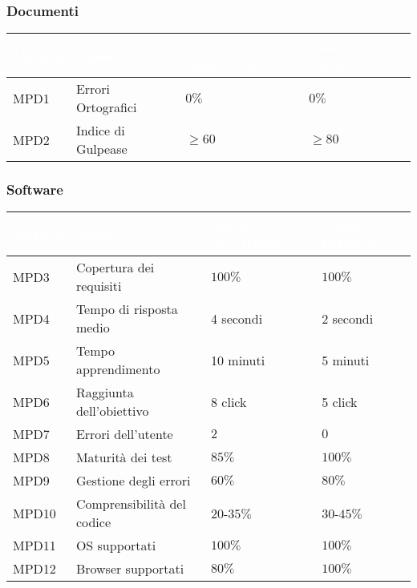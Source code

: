 \subsubsection{Documenti}
\begin{center}
  \renewcommand{\arraystretch}{1.25}
  \begin{longtable}{|p{1.8cm}|p{3.5cm}|p{3.8cm}|p{3.3cm}|} \hline
    \rowcolor[HTML]{036400}
    \textcolor{white}{\textbf{Metrica}} & \textcolor{white}{\textbf{Nome}} & \textcolor{white}{\textbf{Valore Accettabile}} & \textcolor{white}{\textbf{Valore Ottimale}}    \\ \hline
      \rowcolor[HTML]{EFEFEF}
      MPD1 & Errori Ortografici    & $0\%$      & $0\%$        \\ \hline
      \rowcolor[HTML]{C0C0C0}
      MPD2 & Indice di Gulpease    & $\geq60$   & $\geq80$     \\ \hline
  \end{longtable}
\end{center}

\subsubsection{Software}
\begin{center}
  \renewcommand{\arraystretch}{1.25}
  \begin{longtable}{|p{1.8cm}|p{4.5cm}|p{3.8cm}|p{3.5cm}|} \hline
    \rowcolor[HTML]{036400}
    \textcolor{white}{\textbf{Metrica}} & \textcolor{white}{\textbf{Nome}} & \textcolor{white}{\textbf{Valore Accettabile}} & \textcolor{white}{\textbf{Valore Ottimale}}   \\ \hline
      MPD3 & Copertura dei requisiti & $100\%$ & $100\%$  \\ \hline
      \rowcolor[HTML]{EFEFEF}
      MPD4 & Tempo di risposta medio    &  4 secondi  &  2 secondi   \\ \hline
      \rowcolor[HTML]{C0C0C0}
      MPD5 & Tempo apprendimento    & 10 minuti  & 5 minuti       \\ \hline
      \rowcolor[HTML]{EFEFEF}
      MPD6 & Raggiunta dell'obiettivo    & 8 click   & 5 click     \\ \hline
      \rowcolor[HTML]{C0C0C0}
      MPD7 & Errori dell'utente    & $2$      & $0$        \\ \hline
      \rowcolor[HTML]{EFEFEF}
      MPD8 & Maturità dei test    & $85\%$ &  $100\%$    \\ \hline
      \rowcolor[HTML]{C0C0C0}
      MPD9 & Gestione degli errori    & $60\%$ & $80\%$     \\ \hline
      \rowcolor[HTML]{EFEFEF}
      MPD10 & Comprensibilità del codice    & $20$-$35\%$ & $30$-$45\%$     \\ \hline
      \rowcolor[HTML]{C0C0C0}
      MPD11 & OS supportati    & $100\%$ & $100\%$     \\ \hline
      \rowcolor[HTML]{EFEFEF}
      MPD12 & Browser supportati    & $80\%$ & $100\%$     \\ \hline
  \end{longtable}
\end{center}
